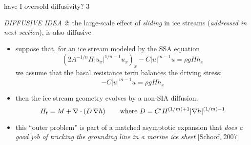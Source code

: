 \begin{frame}{have I oversold diffusivity? 3}

\emph{DIFFUSIVE IDEA 2}: the large-scale effect of \emph{sliding} in ice streams (\emph{addressed in next section}), is also diffusive
\begin{itemize}
\item suppose that, for an ice stream modeled by the SSA equation
   $$\left(2 A^{-1/n} H |u_x|^{1/n - 1} u_x \right)_x - C|u|^{m-1}u = \rho g H h_x$$
we assume that the basal resistance term balances the driving stress:
   $$- C|u|^{m-1}u = \rho g H h_x$$
\item then the ice stream geometry evolves by a non-SIA diffusion,
	$$H_t = M + \nabla\cdot\left(D\,\nabla h\right) \qquad \text{where } D = C' H^{(1/m)+1}|\nabla h|^{(1/m)-1}$$
\item this ``outer problem'' is part of a matched asymptotic expansion that \emph{does a good job of tracking the grounding line in a marine ice sheet} [Schoof, 2007]
\end{itemize}
\end{frame}
